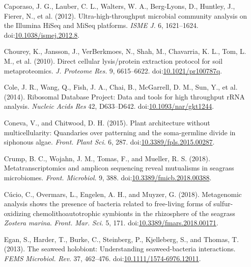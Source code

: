 \documentclass[12pt,]{article}
\begin{document}
\leavevmode\hypertarget{ref-Caporaso2012}{}%
Caporaso, J. G., Lauber, C. L., Walters, W. A., Berg-Lyons, D., Huntley,
J., Fierer, N., et al. (2012). Ultra-high-throughput microbial community
analysis on the Illumina HiSeq and MiSeq platforms. \emph{ISME J.} 6,
1621--1624.
doi:\href{https://doi.org/10.1038/ismej.2012.8}{10.1038/ismej.2012.8}.

\leavevmode\hypertarget{ref-Chourey2010}{}%
Chourey, K., Jansson, J., VerBerkmoes, N., Shah, M., Chavarria, K. L.,
Tom, L. M., et al. (2010). Direct cellular lysis/protein extraction
protocol for soil metaproteomics. \emph{J. Proteome Res.} 9, 6615--6622.
doi:\href{https://doi.org/10.1021/pr100787q}{10.1021/pr100787q}.

\leavevmode\hypertarget{ref-Cole2014}{}%
Cole, J. R., Wang, Q., Fish, J. A., Chai, B., McGarrell, D. M., Sun, Y.,
et al. (2014). Ribosomal Database Project: Data and tools for high
throughput rRNA analysis. \emph{Nucleic Acids Res} 42, D633--D642.
doi:\href{https://doi.org/10.1093/nar/gkt1244}{10.1093/nar/gkt1244}.

\leavevmode\hypertarget{ref-Coneva2015}{}%
Coneva, V., and Chitwood, D. H. (2015). Plant architecture without
multicellularity: Quandaries over patterning and the soma-germline
divide in siphonous algae. \emph{Front. Plant Sci.} 6, 287.
doi:\href{https://doi.org/10.3389/fpls.2015.00287}{10.3389/fpls.2015.00287}.

\leavevmode\hypertarget{ref-Crump2018}{}%
Crump, B. C., Wojahn, J. M., Tomas, F., and Mueller, R. S. (2018).
Metatranscriptomics and amplicon sequencing reveal mutualisms in
seagrass microbiomes. \emph{Front. Microbiol.} 9, 388.
doi:\href{https://doi.org/10.3389/fmicb.2018.00388}{10.3389/fmicb.2018.00388}.

\leavevmode\hypertarget{ref-Cucio2018}{}%
Cúcio, C., Overmars, L., Engelen, A. H., and Muyzer, G. (2018).
Metagenomic analysis shows the presence of bacteria related to
free-living forms of sulfur-oxidizing chemolithoautotrophic symbionts in
the rhizosphere of the seagrass \emph{Zostera marina}. \emph{Front. Mar.
Sci.} 5, 171.
doi:\href{https://doi.org/10.3389/fmars.2018.00171}{10.3389/fmars.2018.00171}.

\leavevmode\hypertarget{ref-Egan2013}{}%
Egan, S., Harder, T., Burke, C., Steinberg, P., Kjelleberg, S., and
Thomas, T. (2013). The seaweed holobiont: Understanding seaweed-bacteria
interactions. \emph{FEMS Microbiol. Rev.} 37, 462--476.
doi:\href{https://doi.org/10.1111/1574-6976.12011}{10.1111/1574-6976.12011}.
\end{document}
